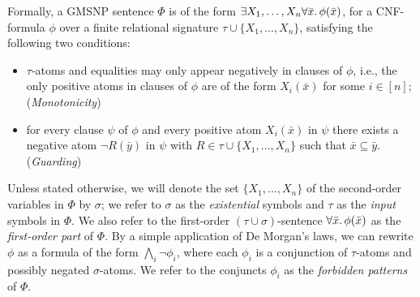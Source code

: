 \documentclass[oneside,reqno,12pt]{amsart}
\theoremstyle{plain}
\theoremstyle{remark}
\begin{document}
Formally, a GMSNP sentence $\Phi$ is of the form 
$\exists X_1,\dots, X_n \forall \bar{x}\ldotp \phi(\bar{x})$,
for a CNF-formula $\phi$ over a finite relational signature $\tau\cup \{X_1,\dots, X_n\}$,  satisfying the following two conditions:
\begin{itemize}
    \item $\tau$-atoms and equalities may only appear negatively in clauses of $\phi$, i.e., the only positive atoms in clauses of $\phi$ are of the form $X_i(\bar{x})$ for some $i\in [n]$;  \hfill (\emph{Monotonicity}) 
    \item for every clause $\psi$ of $\phi$ and every positive atom $X_i(\bar{x})$ in $\psi$ there exists a negative atom $\neg R(\bar{y})$ in $\psi$ with $R\in \tau \cup \{X_1,\dots, X_n\}$ such that $\bar{x}\subseteq \bar{y}$. \hfill  (\emph{Guarding})
\end{itemize}  
Unless stated otherwise, we will denote the set $\{X_1,\dots, X_n\}$ of the second-order variables in $\Phi$ by $\sigma$; we refer to $\sigma$ as the \emph{existential} symbols and $\tau$ as the \emph{input} symbols in $\Phi$.
We also refer to the first-order $(\tau\cup \sigma)$-sentence $\forall \bar{x}\ldotp \phi(\bar{x})$ as the \emph{first-order part} of $\Phi$.
By a simple application of De Morgan's laws, we can rewrite $\phi$ as a formula of the form $\bigwedge_i \neg \phi_i$, where each $\phi_i$ is a conjunction of $\tau$-atoms and possibly negated $\sigma$-atoms. 
We refer to the conjuncts $\phi_i$ as the \emph{forbidden patterns} of $\Phi$. 
\end{document}
